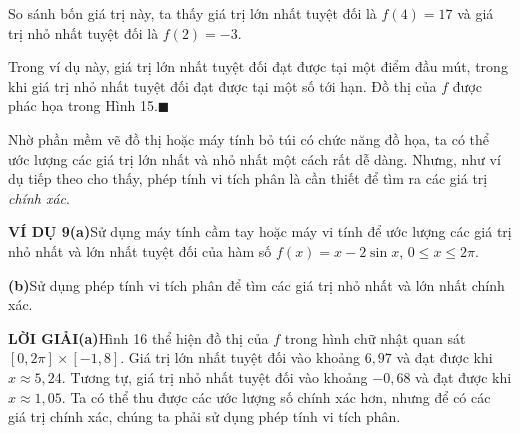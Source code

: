 \begin{minipage}[t]{0.72\textwidth}
    \vspace*{0pt}
    \noindent
    So sánh bốn giá trị này, ta thấy giá trị lớn nhất tuyệt đối là $f(4) = 17$ và giá trị nhỏ nhất tuyệt đối là $f(2) = -3$.

    Trong ví dụ này, giá trị lớn nhất tuyệt đối đạt được tại một điểm đầu mút, trong khi giá trị nhỏ nhất tuyệt đối đạt được tại một số tới hạn. Đồ thị của $f$ được phác họa trong Hình 15.\hfill{\color{stewartcyan}$\blacksquare$}

    \vspace{8pt}
    Nhờ phần mềm vẽ đồ thị hoặc máy tính bỏ túi có chức năng đồ họa, ta có thể ước lượng các giá trị lớn nhất và nhỏ nhất một cách rất dễ dàng. Nhưng, như ví dụ tiếp theo cho thấy, phép tính vi tích phân là cần thiết để tìm ra các giá trị \emph{chính xác}.

    \vspace{8pt}
    \noindent
    \textbf{\textsf{\color{stewartcyan}VÍ DỤ 9}}\enspace \textbf{\textsf{\color{stewartcyan}(a)}}\enspace Sử dụng máy tính cầm tay hoặc máy vi tính để ước lượng các giá trị nhỏ nhất và lớn nhất tuyệt đối của hàm số $f(x) = x - 2 \sin x$, $0 \le x \le 2\pi$.\par
    \noindent
    \textbf{\textsf{\color{stewartcyan}(b)}}\enspace Sử dụng phép tính vi tích phân để tìm các giá trị nhỏ nhất và lớn nhất chính xác.

    \vspace{6pt}
    \noindent
    \textbf{\textsf{\color{stewartcyan}LỜI GIẢI}}\enspace \textbf{\textsf{\color{stewartcyan}(a)}}\enspace Hình 16 thể hiện đồ thị của $f$ trong hình chữ nhật quan sát $[0, 2\pi] \times [-1, 8]$. Giá trị lớn nhất tuyệt đối vào khoảng $6{,}97$ và đạt được khi $x \approx 5{,}24$. Tương tự, giá trị nhỏ nhất tuyệt đối vào khoảng $-0{,}68$ và đạt được khi $x \approx 1{,}05$. Ta có thể thu được các ước lượng số chính xác hơn, nhưng để có các giá trị chính xác, chúng ta phải sử dụng phép tính vi tích phân.\par


\end{minipage}
